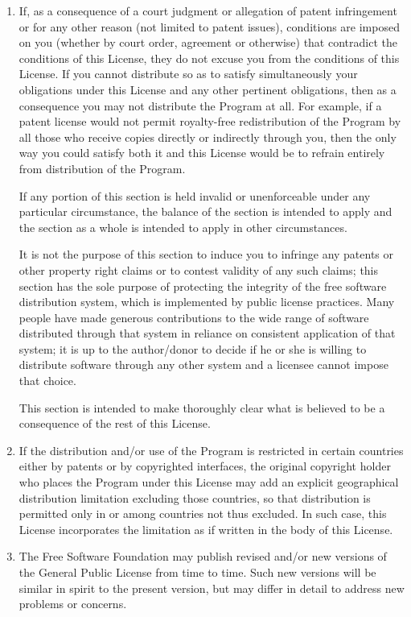 \documentclass{book}
\begin{document}
{\begin{enumerate}
\item
If, as a consequence of a court judgment or allegation of patent
infringement or for any other reason (not limited to patent issues),
conditions are imposed on you (whether by court order, agreement or
otherwise) that contradict the conditions of this License, they do not
excuse you from the conditions of this License.  If you cannot
distribute so as to satisfy simultaneously your obligations under this
License and any other pertinent obligations, then as a consequence you
may not distribute the Program at all.  For example, if a patent
license would not permit royalty-free redistribution of the Program by
all those who receive copies directly or indirectly through you, then
the only way you could satisfy both it and this License would be to
refrain entirely from distribution of the Program.

If any portion of this section is held invalid or unenforceable under
any particular circumstance, the balance of the section is intended to
apply and the section as a whole is intended to apply in other
circumstances.

It is not the purpose of this section to induce you to infringe any
patents or other property right claims or to contest validity of any
such claims; this section has the sole purpose of protecting the
integrity of the free software distribution system, which is
implemented by public license practices.  Many people have made
generous contributions to the wide range of software distributed
through that system in reliance on consistent application of that
system; it is up to the author/donor to decide if he or she is willing
to distribute software through any other system and a licensee cannot
impose that choice.

This section is intended to make thoroughly clear what is believed to
be a consequence of the rest of this License.

\item
If the distribution and/or use of the Program is restricted in
certain countries either by patents or by copyrighted interfaces, the
original copyright holder who places the Program under this License
may add an explicit geographical distribution limitation excluding
those countries, so that distribution is permitted only in or among
countries not thus excluded.  In such case, this License incorporates
the limitation as if written in the body of this License.

\item
The Free Software Foundation may publish revised and/or new versions
of the General Public License from time to time.  Such new versions will
be similar in spirit to the present version, but may differ in detail to
address new problems or concerns.


\end{enumerate}}
\end{document}
